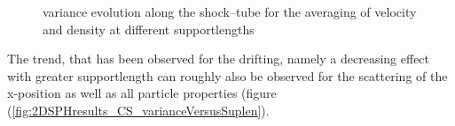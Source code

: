 \documentclass{report}
\begin{document}
\begin{figure}[!htbp]
\centering
\label{fig:2DSPHresults_CS_variance}

\caption[]{variance evolution along the shock--tube for the averaging of velocity and density at different supportlengths}

\end{figure}

The trend, that has been observed for the drifting, namely a decreasing effect with greater supportlength can roughly also be observed for the scattering of the x-position as well as all particle properties (figure (\ref{fig:2DSPHresults_CS_varianceVersusSuplen}).
\end{document}
